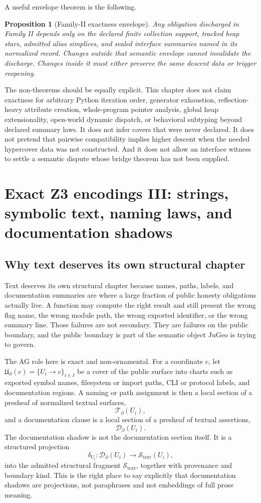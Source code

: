 \documentclass[11pt]{report}
\newtheorem{proposition}[definition]{Proposition}
\begin{document}
A useful envelope theorem is the following.

\begin{proposition}[Family-II exactness envelope]
Any obligation discharged in Family II depends only on the declared finite collection support, tracked heap stars, admitted alias simplices, and sealed interface summaries named in its normalized record. Changes outside that semantic envelope cannot invalidate the discharge. Changes inside it must either preserve the same descent data or trigger reopening.
\end{proposition}

The non-theorems should be equally explicit. This chapter does not claim exactness for arbitrary Python iteration order, generator exhaustion, reflection-heavy attribute creation, whole-program pointer analysis, global heap extensionality, open-world dynamic dispatch, or behavioral subtyping beyond declared summary laws. It does not infer covers that were never declared. It does not pretend that pairwise compatibility implies higher descent when the needed hypercover data was not constructed. And it does not allow an interface witness to settle a semantic dispute whose bridge theorem has not been supplied.

\chapter{Exact Z3 encodings III: strings, symbolic text, naming laws, and documentation shadows}
\section{Why text deserves its own structural chapter}
Text deserves its own structural chapter because names, paths, labels, and documentation summaries are where a large fraction of public honesty obligations actually live. A function may compute the right result and still present the wrong flag name, the wrong module path, the wrong exported identifier, or the wrong summary line. Those failures are not secondary. They are failures on the public boundary, and the public boundary is part of the semantic object JuGeo is trying to govern.

The AG role here is exact and non-ornamental. For a coordinate $c$, let $\mathfrak{U}_{\partial}(c)=\{U_i \to c\}_{i\in I}$ be a cover of the public surface into charts such as exported symbol names, filesystem or import paths, CLI or protocol labels, and documentation regions. A naming or path assignment is then a local section of a presheaf of normalized textual surfaces,
\[
\mathscr{T}_{\partial}(U_i),
\]
and a documentation clause is a local section of a presheaf of textual assertions,
\[
\mathscr{D}_{\partial}(U_i).
\]
The documentation shadow is not the documentation section itself. It is a structured projection
\[
\delta_{U_i} : \mathscr{D}_{\partial}(U_i) \to \mathscr{S}_{\mathrm{text}}(U_i),
\]
into the admitted structural fragment $\mathscr{S}_{\mathrm{text}}$, together with provenance and boundary kind. This is the right place to say explicitly that documentation shadows are projections, not paraphrases and not embeddings of full prose meaning.
\end{document}
